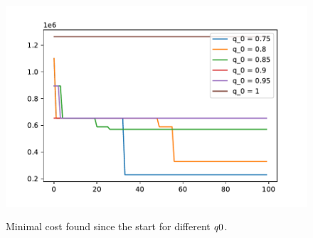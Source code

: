 \begin{figure}[h]
	\begin{centering}
		{\includegraphics[scale=0.8]{figures/experiments/q_0.pdf}}
		\caption[Parameter study: $\protect q0$]{Minimal cost found since the start for different $\protect q0$.}
		\label{fig:q_0}
	\end{centering}
\end{figure}
